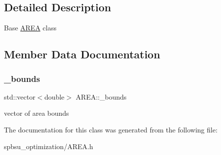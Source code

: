 \subsection{Detailed Description}
Base \hyperlink{class_a_r_e_a}{A\+R\+EA} class 

\subsection{Member Data Documentation}
\mbox{\label{class_a_r_e_a_a9c56910797786fb4d97e42c7829798b7}} 
\subsubsection{\texorpdfstring{\+\_\+bounds}{\_bounds}}
{\footnotesize\ttfamily std\+::vector$<$double$>$ A\+R\+E\+A\+::\+\_\+bounds\hspace{0.3cm}{\ttfamily [protected]}}

vector of area bounds 

The documentation for this class was generated from the following file\+:\begin{DoxyCompactItemize}
\item 
spbsu\+\_\+optimization/A\+R\+E\+A.\+h\end{DoxyCompactItemize}
